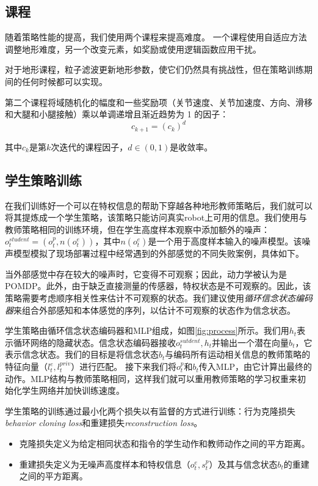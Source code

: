 \subsection[课程]{课程}
随着策略性能的提高，我们使用两个课程来提高难度。
一个课程使用自适应方法\cite[p]{Lee_Hwangbo_Wellhausen_Koltun_Hutter_2020}调整地形难度，另一个改变元素，如奖励或使用逻辑函数\cite[p]{Hwangbo_Lee_Dosovitskiy_Bellicoso_Tsounis_Koltun_Hutter_2019}应用干扰。

对于地形课程，粒子滤波更新地形参数，使它们仍然具有挑战性，但在策略训练期间的任何时候都可以实现\cite[p]{Lee_Hwangbo_Wellhausen_Koltun_Hutter_2020}。

第二个课程将域随机化的幅度和一些奖励项（关节速度、关节加速度、方向、滑移和大腿和小腿接触）乘以单调递增且渐近趋势为 1 的因子：$$c_{k+1}=(c_k)^d$$

其中$c_k$是第$k$次迭代的课程因子，$d\in(0,1)$是收敛率。

\subsection[学生策略训练]{学生策略训练}

在我们训练好一个可以在特权信息的帮助下穿越各种地形教师策略后，我们就可以将其提炼成一个学生策略，该策略只能访问真实robot上可用的信息。我们使用与教师策略相同的训练环境，但在学生高度样本观察中添加额外的噪声：$o_t^{student}=(o_t^p,n(o_t^e))$，其中$n(o_t^e)$是一个用于高度样本输入的噪声模型。该噪声模型模拟了现场部署过程中经常遇到的外部感觉的不同失败案例，具体如下。

当外部感觉中存在较大的噪声时，它变得不可观察；因此，动力学被认为是POMDP。此外，由于缺乏直接测量的传感器，特权状态是不可观察的。因此，该策略需要考虑顺序相关性来估计不可观察的状态。我们建议使用\emph{循环信念状态编码器}来组合外部感知和本体感觉的序列，以估计不可观察的状态作为信念状态。

学生策略由循环信念状态编码器和MLP组成，如图\ref{fig:process}所示。我们用$h_t$表示循环网络的隐藏状态。信念状态编码器接收$o_t^{sutdent},h_t$并输出一个潜在向量$b_t$，它表示信念状态。我们的目标是将信念状态$b_t$与编码所有运动相关信息的教师策略的特征向量（$l_t^e, l_t^{priv}$）进行匹配。
接下来我们将$o_t^p$和$b_t$传入MLP，由它计算出最终的动作。MLP结构与教师策略相同，这样我们就可以重用教师策略的学习权重来初始化学生网络并加快训练速度。

学生策略的训练通过最小化两个损失以有监督的方式进行训练：行为克隆损失\emph{behavior cloning loss}和重建损失\emph{reconstruction loss}。
\begin{itemize}
  \item 克隆损失定义为给定相同状态和指令的学生动作和教师动作之间的平方距离。
  \item 重建损失定义为无噪声高度样本和特权信息（$o_t^e, s_t^p$）及其与信念状态$b_t$的重建之间的平方距离。
\end{itemize}

